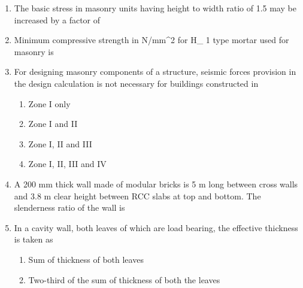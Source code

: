 \documentclass[11pt,a4paper]{article}
\begin{document}
\begin{enumerate}
\item{The basic stress in masonry units having height to width ratio of 1.5 may be increased by a factor of}
\\
\item{Minimum compressive strength in N/mm\^{}2 for H\_ 1 type mortar used for masonry is
}
\\
\item{For designing masonry components of a structure, seismic forces provision in the design calculation is not necessary for buildings constructed in}
\begin{enumerate}[label=\Alph*.]
\item{Zone I only}
\item{Zone I and II}
\item{Zone I, II and III}
\item{Zone I, II, III and IV}
\end{enumerate}
\item{A 200 mm thick wall made of modular bricks is 5 m long between cross walls and 3.8 m clear height between RCC slabs at top and bottom. The slenderness ratio of the wall is}
\\
\item{In a cavity wall, both leaves of which are load bearing, the effective thickness is taken as}
\begin{enumerate}[label=\Alph*.]
\item{Sum of thickness of both leaves}
\item{Two-third of the sum of thickness of both the leaves}

\end{enumerate}
\end{enumerate}
\end{document}
